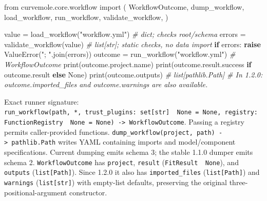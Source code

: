 \documentclass[
  10pt,
  a4paper,
  oneside]{scrreprt}
\newenvironment{Shaded}{}{}
\newcommand{\BuiltInTok}[1]{#1}
\newcommand{\CommentTok}[1]{\textcolor[rgb]{0.38,0.63,0.69}{\textit{#1}}}
\newcommand{\ControlFlowTok}[1]{\textcolor[rgb]{0.00,0.44,0.13}{\textbf{#1}}}
\newcommand{\ImportTok}[1]{#1}
\newcommand{\NormalTok}[1]{#1}
\newcommand{\OperatorTok}[1]{\textcolor[rgb]{0.40,0.40,0.40}{#1}}
\newcommand{\PreprocessorTok}[1]{\textcolor[rgb]{0.74,0.48,0.00}{#1}}
\newcommand{\StringTok}[1]{\textcolor[rgb]{0.25,0.44,0.63}{#1}}
\newcommand{\VariableTok}[1]{\textcolor[rgb]{0.10,0.09,0.49}{#1}}
\begin{document}
\begin{Shaded}
\begin{Highlighting}[]
\ImportTok{from}\NormalTok{ curvemole.core.workflow }\ImportTok{import}\NormalTok{ (}
\NormalTok{    WorkflowOutcome, dump\_workflow, load\_workflow, run\_workflow, validate\_workflow,}
\NormalTok{)}

\NormalTok{value }\OperatorTok{=}\NormalTok{ load\_workflow(}\StringTok{"workflow.yml"}\NormalTok{)       }\CommentTok{\# dict; checks root/schema}
\NormalTok{errors }\OperatorTok{=}\NormalTok{ validate\_workflow(value)           }\CommentTok{\# list[str]; static checks, no data import}
\ControlFlowTok{if}\NormalTok{ errors:}
    \ControlFlowTok{raise} \PreprocessorTok{ValueError}\NormalTok{(}\StringTok{"; "}\NormalTok{.join(errors))}
\NormalTok{outcome }\OperatorTok{=}\NormalTok{ run\_workflow(}\StringTok{"workflow.yml"}\NormalTok{)      }\CommentTok{\# WorkflowOutcome}
\BuiltInTok{print}\NormalTok{(outcome.project.name)}
\BuiltInTok{print}\NormalTok{(outcome.result.success }\ControlFlowTok{if}\NormalTok{ outcome.result }\ControlFlowTok{else} \VariableTok{None}\NormalTok{)}
\BuiltInTok{print}\NormalTok{(outcome.outputs)                      }\CommentTok{\# list[pathlib.Path]}
\CommentTok{\# In 1.2.0: outcome.imported\_files and outcome.warnings are also available.}
\end{Highlighting}
\end{Shaded}

Exact runner signature:
\texttt{run\_workflow(path,\ *,\ trust\_plugins:\ set{[}str{]}\ \textbar{}\ None\ =\ None,\ registry:\ FunctionRegistry\ \textbar{}\ None\ =\ None)\ -\textgreater{}\ WorkflowOutcome}.
Passing a registry permits caller-provided functions.
\texttt{dump\_workflow(project,\ path)\ -\textgreater{}\ pathlib.Path}
writes YAML containing imports and model/component specifications.
Current dumping emits schema 3; the stable 1.1.0 dumper emits schema 2.
\texttt{WorkflowOutcome} has \texttt{project}, \texttt{result}
(\texttt{FitResult\ \textbar{}\ None}), and \texttt{outputs}
(\texttt{list{[}Path{]}}). Since 1.2.0 it also has
\texttt{imported\_files} (\texttt{list{[}Path{]}}) and \texttt{warnings}
(\texttt{list{[}str{]}}) with empty-list defaults, preserving the
original three-positional-argument constructor.
\end{document}
